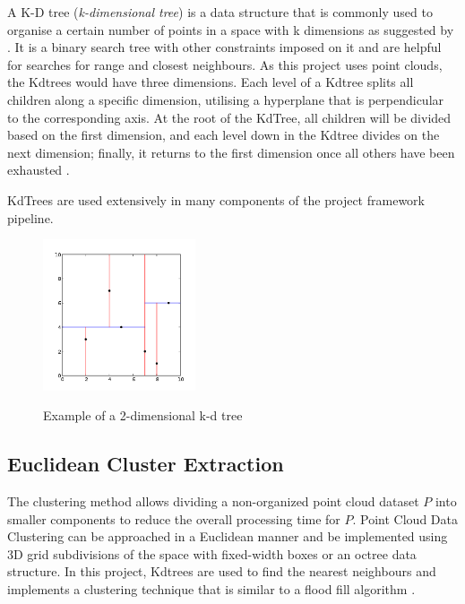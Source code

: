 \documentclass[12pt]{report}
\begin{document}
A K-D tree (\textit{k-dimensional tree}) is a data structure that is commonly used to organise a certain number of points in a space with k dimensions as suggested by .
It is a binary search tree with other constraints imposed on it and are helpful for searches for range and closest neighbours.
As this project uses point clouds, the Kdtrees would have three dimensions. Each level of a Kdtree splits all children along a specific dimension, utilising a hyperplane that is perpendicular to the corresponding axis. 
At the root of the KdTree, all children will be divided based on the first dimension, and each level down in the Kdtree divides on the next dimension; finally, it returns to the first dimension once 
all others have been exhausted .

KdTrees are used extensively in many components of the project framework pipeline.
\begin{figure}[H]%
  \centering
  \includegraphics[width=0.4\textwidth]{2d_kdtree.png}
 \caption{Example of a 2-dimensional k-d tree}\cite[]{Rusu_ICRA2011_PCL}
 \label{fig:kdtree} 
\end{figure}






\subsection{Euclidean Cluster Extraction}
\label{section:Euclidean Cluster Extraction}

The clustering method allows dividing a non-organized point cloud dataset \textbf{$P$} into smaller components to reduce the overall processing time for \textbf{$P$}.
Point Cloud Data Clustering can be approached in a Euclidean manner and be implemented using 3D grid subdivisions of the space with fixed-width boxes or an octree data structure.
In this project, Kdtrees are used to find the nearest neighbours and implements a clustering technique that is similar to a flood fill algorithm .
\end{document}
